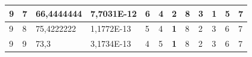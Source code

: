 \documentclass[conference]{IEEEtran}
\begin{document}
\begin{table}[]
\begin{tabular}{|llll|llllllll|}
\multicolumn{1}{|l|}{9}                                                     & \multicolumn{1}{l|}{7}                                                        & \multicolumn{1}{l|}{66,4444444}                                                   & 7,7031E-12                     & \multicolumn{1}{l|}{6}                                                  & \multicolumn{1}{l|}{4}                                                  & \multicolumn{1}{l|}{2}                                                  & \multicolumn{1}{l|}{8}                                                  & \multicolumn{1}{l|}{3}                                                  & \multicolumn{1}{l|}{\textbf{1}}                                         & \multicolumn{1}{l|}{5}                                                  & 7                          \\ \hline
\multicolumn{1}{|l|}{9}                                                     & \multicolumn{1}{l|}{8}                                                        & \multicolumn{1}{l|}{75,4222222}                                                   & 1,1772E-13                     & \multicolumn{1}{l|}{5}                                                  & \multicolumn{1}{l|}{4}                                                  & \multicolumn{1}{l|}{\textbf{1}}                                         & \multicolumn{1}{l|}{8}                                                  & \multicolumn{1}{l|}{2}                                                  & \multicolumn{1}{l|}{3}                                                  & \multicolumn{1}{l|}{6}                                                  & 7                          \\ \hline
\multicolumn{1}{|l|}{9}                                                     & \multicolumn{1}{l|}{9}                                                        & \multicolumn{1}{l|}{73,3}                                                         & 3,1734E-13                     & \multicolumn{1}{l|}{4}                                                  & \multicolumn{1}{l|}{5}                                                  & \multicolumn{1}{l|}{\textbf{1}}                                         & \multicolumn{1}{l|}{8}                                                  & \multicolumn{1}{l|}{2}                                                  & \multicolumn{1}{l|}{3}                                                  & \multicolumn{1}{l|}{6}                                                  & 7                          \\ \hline

\end{tabular}
\end{table}
\end{document}
